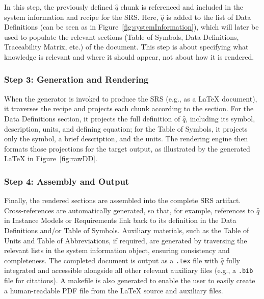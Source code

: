In this step, the previously defined $\hat{q}$ chunk is referenced and included 
in the system information and recipe for the \gb{} SRS. Here, $\hat{q}$ is 
added to the list of Data Definitions (can be seen as  
in Figure~\ref{fig:systemInformation}), which will later be used to populate 
the relevant sections (Table of Symbols, Data Definitions, Traceability Matrix, 
etc.) of the document. This step is about specifying what 
knowledge is relevant and where it should appear, not about how it is rendered.

\subsubsection{Step 3: Generation and Rendering}
When the generator is invoked to produce the SRS (e.g., as a \LaTeX{}
document), it traverses the recipe and projects each chunk according to the
section. For the Data Definitions section, it projects the full definition of
$\hat{q}$, including its symbol, description, units, and defining equation;
for the Table of Symbols, it projects only the symbol, a brief description,
and the units. The rendering engine then formats those projections for the
target output, as illustrated by the generated \LaTeX{} in
Figure~\ref{fig:rawDD}.


\subsubsection{Step 4: Assembly and Output}

Finally, the rendered sections are assembled into the complete SRS artifact. 
Cross-references are automatically generated, so that, for example, references 
to $\hat{q}$ in Instance Models or Requirements link back to its definition in 
the Data Definitions and/or Table of Symbols. Auxiliary materials, such as the 
Table of Units and Table of Abbreviations, if required, are generated by 
traversing the relevant lists in the system information object, ensuring 
consistency and completeness. The completed document is output as a 
\texttt{.tex} file with $\hat{q}$ fully integrated and accessible 
alongside all other relevant auxiliary files (e.g., a \texttt{.bib} file for
citations). A makefile is also generated to 
enable the user to easily create a human-readable PDF file from the \LaTeX{} 
source and auxiliary files.

